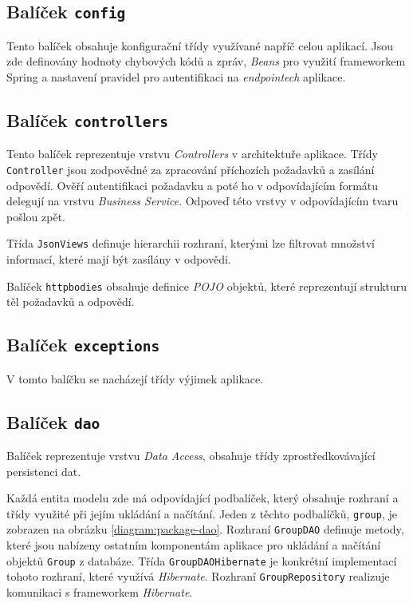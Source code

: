 \documentclass[thesis=B,czech]{FITthesis}[2012/06/26]
\begin{document}
		\subsection{Balíček \texttt{config}}
			Tento balíček obsahuje konfigurační třídy využívané napříč celou aplikací. Jsou zde definovány hodnoty chybových kódů a zpráv, \textit{Beans} pro využití frameworkem Spring a nastavení pravidel pro autentifikaci na \textit{endpointech} aplikace.
			
		\subsection{Balíček \texttt{controllers}}
			Tento balíček reprezentuje vrstvu \textit{Controllers} v architektuře aplikace. Třídy \texttt{Controller} jsou zodpovědné za zpracování příchozích požadavků a zasílání odpovědí. Ověří autentifikaci požadavku a poté ho v odpovídajícím formátu delegují na vrstvu \textit{Business Service}. Odpoveď této vrstvy v odpovídajícím tvaru pošlou zpět.
			
			Třída \texttt{JsonViews} definuje hierarchii rozhraní, kterými lze filtrovat množství informací, které mají být zasílány v odpovědi.
			
			Balíček \texttt{httpbodies} obsahuje definice \textit{POJO} objektů, které reprezentují strukturu těl požadavků a odpovědí.
			
		\subsection{Balíček \texttt{exceptions}}
			V tomto balíčku se nacházejí třídy výjimek aplikace.
			
		\subsection{Balíček \texttt{dao}}
			Balíček reprezentuje vrstvu \textit{Data Access}, obsahuje třídy zprostředkovávající persistenci dat.
			
			Každá entita modelu zde má odpovídající podbalíček, který obsahuje rozhraní a třídy využité při jejím ukládání a načítání. Jeden z těchto podbalíčků, \texttt{group}, je zobrazen na obrázku \ref{diagram:package-dao}. Rozhraní \texttt{GroupDAO} definuje metody, které jsou nabízeny ostatním komponentám aplikace pro ukládání a načítání objektů \texttt{Group} z databáze. Třída \texttt{GroupDAOHibernate} je konkrétní implementací tohoto rozhraní, které využívá \textit{Hibernate}. Rozhraní \texttt{GroupRepository} realizuje komunikaci s frameworkem \textit{Hibernate}.
			
\end{document}
